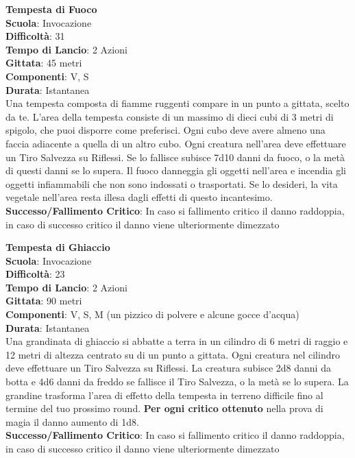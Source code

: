 \begin{multicols}{2}
\medskip\textbf{Tempesta di Fuoco}\\
\textbf{Scuola}: Invocazione\\
\textbf{Difficoltà}: 31\\
\textbf{Tempo di Lancio}: 2 Azioni\\
\textbf{Gittata}: 45 metri\\
\textbf{Componenti}: V, S\\
\textbf{Durata}: Istantanea\\
Una tempesta composta di fiamme ruggenti compare in un punto a gittata, scelto da te. L'area della tempesta consiste di un massimo di dieci cubi di 3 metri di spigolo, che puoi disporre come preferisci. Ogni cubo deve avere almeno una faccia adiacente a quella di un altro cubo. Ogni creatura nell'area deve effettuare un Tiro Salvezza su Riflessi. Se lo fallisce subisce 7d10 danni da fuoco, o la metà di questi danni se lo supera. Il fuoco danneggia gli oggetti nell'area e incendia gli oggetti infiammabili che non sono indossati o trasportati. Se lo desideri, la vita vegetale nell'area resta illesa dagli effetti di questo incantesimo. \\
\textbf{Successo/Fallimento Critico}: In caso si fallimento critico il danno raddoppia, in caso di successo critico il danno viene ulteriormente dimezzato

\medskip\textbf{Tempesta di Ghiaccio}\\
\textbf{Scuola}: Invocazione\\
\textbf{Difficoltà}: 23\\
\textbf{Tempo di Lancio}: 2 Azioni\\
\textbf{Gittata}: 90 metri\\
\textbf{Componenti}: V, S, M (un pizzico di polvere e alcune gocce d'acqua)\\
\textbf{Durata}: Istantanea\\
Una grandinata di ghiaccio si abbatte a terra in un cilindro di 6 metri di raggio e 12 metri di altezza centrato su di un punto a gittata. Ogni creatura nel cilindro deve effettuare un Tiro Salvezza su Riflessi. La creatura subisce 2d8 danni da botta e 4d6 danni da freddo se fallisce il Tiro Salvezza, o la metà se lo supera. La grandine trasforma l'area di effetto della tempesta in terreno difficile fino al termine del tuo prossimo round.
\textbf{Per ogni critico ottenuto} nella prova di magia il danno aumento di 1d8.\\
\textbf{Successo/Fallimento Critico}: In caso si fallimento critico il danno raddoppia, in caso di successo critico il danno viene ulteriormente dimezzato


\end{multicols}
